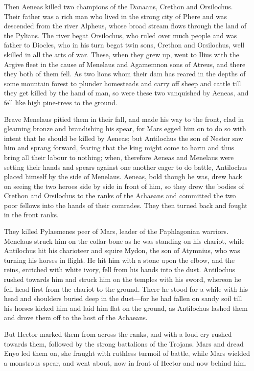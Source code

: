 Then Aeneas killed two champions of the Danaans, Crethon and Orsilochus.
Their father was a rich man who lived in the strong city of Phere and was
descended from the river Alpheus, whose broad stream flows through the
land of the Pylians. The river begat Orsilochus, who ruled over much
people and was father to Diocles, who in his turn begat twin sons, Crethon
and Orsilochus, well skilled in all the arts of war. These, when they grew
up, went to Ilius with the Argive fleet in the cause of Menelaus and
Agamemnon sons of Atreus, and there they both of them fell. As two lions
whom their dam has reared in the depths of some mountain forest to plunder
homesteads and carry off sheep and cattle till they get killed by the hand
of man, so were these two vanquished by Aeneas, and fell like high
pine-trees to the ground.

Brave Menelaus pitied them in their fall, and made his way to the front,
clad in gleaming bronze and brandishing his spear, for Mars egged him on
to do so with intent that he should be killed by Aeneas; but Antilochus
the son of Nestor saw him and sprang forward, fearing that the king might
come to harm and thus bring all their labour to nothing; when, therefore
Aeneas and Menelaus were setting their hands and spears against one
another eager to do battle, Antilochus placed himself by the side of
Menelaus. Aeneas, bold though he was, drew back on seeing the two heroes
side by side in front of him, so they drew the bodies of Crethon and
Orsilochus to the ranks of the Achaeans and committed the two poor fellows
into the hands of their comrades. They then turned back and fought in the
front ranks.

They killed Pylaemenes peer of Mars, leader of the Paphlagonian warriors.
Menelaus struck him on the collar-bone as he was standing on his chariot,
while Antilochus hit his charioteer and squire Mydon, the son of Atymnius,
who was turning his horses in flight. He hit him with a stone upon the
elbow, and the reins, enriched with white ivory, fell from his hands into
the dust. Antilochus rushed towards him and struck him on the temples with
his sword, whereon he fell head first from the chariot to the ground.
There he stood for a while with his head and shoulders buried deep in the
dust—for he had fallen on sandy soil till his horses kicked him and
laid him flat on the ground, as Antilochus lashed them and drove them off
to the host of the Achaeans.

But Hector marked them from across the ranks, and with a loud cry rushed
towards them, followed by the strong battalions of the Trojans. Mars and
dread Enyo led them on, she fraught with ruthless turmoil of battle, while
Mars wielded a monstrous spear, and went about, now in front of Hector and
now behind him.

